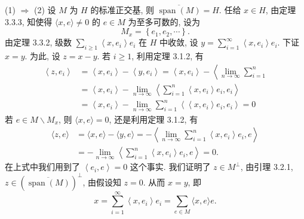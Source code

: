 \documentclass[openany]{ctexbook}
\makeatletter
\theoremstyle{kaiti}
\theoremstyle{normal}
\renewenvironment{proof}[1][\proofname]{\par
    \pushQED{\qed}%
    \normalfont \topsep6\p@\@plus6\p@\relax
    \trivlist
    \item\relax
    {\heiti #1}\hspace{2\labelsep}\ignorespaces
  }{%
    \popQED\endtrivlist\@endpefalse
  }
\makeatother
\begin{document}
\begin{proof}
(1) $\Rightarrow$ (2) 设 $M$ 为 $H$ 的标准正交基, 则 $\overline{\operatorname{span}(M)}=H$. 任给 $x \in H$, 由定理 3.3.3, 知使得 $\langle x, e\rangle \neq 0$ 的 $e \in M$ 为至多可数的, 设为
$$
M_{x}=\left\{e_1, e_2, \cdots\right\}.
$$
由定理 3.3.2, 级数 $\sum_{i \geqslant 1}\left\langle x, e_{i}\right\rangle e_{i}$ 在 $H$ 中收敛, 设 $y=\sum_{i=1}^{\infty}\left\langle x, e_{i}\right\rangle e_{i}$. 下证 $x=y$. 为此, 设 $z=x-y$. 若 $i \geqslant 1$, 利用定理 3.1.2, 有
$$
\begin{aligned}
\left\langle z, e_{i}\right\rangle &=\left\langle x, e_{i}\right\rangle-\left\langle y, e_{i}\right\rangle=\left\langle x, e_{i}\right\rangle-\left\langle\lim_{n \rightarrow \infty} \sum_{i=1}^n\right.\\
&=\left\langle x, e_{i}\right\rangle-\lim_{n \rightarrow \infty}\left\langle\sum_{i=1}^n\left\langle x, e_{i}\right\rangle e_{i}, e_{i}\right\rangle \\
&=\left\langle x, e_{i}\right\rangle-\lim_{n \rightarrow \infty} \sum_{i=1}^n\left\langle\left\langle x, e_{i}\right\rangle e_{i}, e_{i}\right\rangle=0
\end{aligned}
$$
若 $e \in M \backslash M_{x}$, 则 $\langle x, e\rangle=0$, 还是利用定理 3.1.2, 有
$$
\begin{aligned}
\langle z, e\rangle 
&=\langle x, e\rangle-\langle y, e\rangle
=-\left\langle\lim_{n\rightarrow\infty}\sum_{i=1}^{n} \left\langle x, e_{i}\right\rangle e_{i}, e\right\rangle\\
&=-\lim_{n\rightarrow\infty}\left\langle\sum_{i=1}^n\left\langle x, e_{i}\right\rangle e_{i}, e\right\rangle=0.
\end{aligned}
$$
在上式中我们用到了 $\left\langle e_{i}, e\right\rangle=0$ 这个事实. 我们证明了 $z \in M^{\perp}$, 由引理 3.2.1, $z \in(\overline{\operatorname{span}(M)})^{\perp}$, 由假设知 $z=0$. 从而 $x=y$, 即
$$
x=\sum_{i=1}^{\infty}\left\langle x, e_{i}\right\rangle e_{i}=\sum_{e \in M}\langle x, e\rangle e.
$$


\end{proof}
\end{document}
